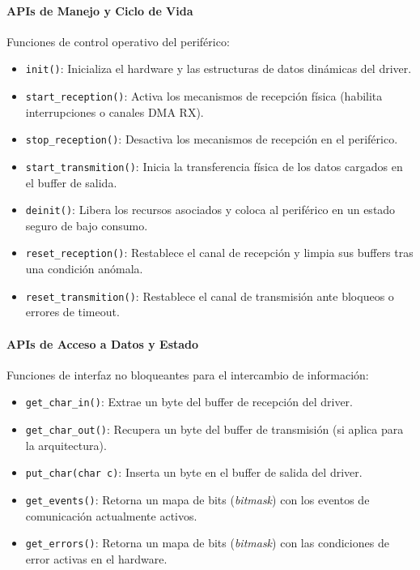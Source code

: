 \paragraph{APIs de Manejo y Ciclo de Vida} Funciones de control operativo del periférico:
\begin{itemize}
    \item \texttt{init()}: Inicializa el hardware y las estructuras de datos dinámicas del driver.
    \item \texttt{start\_reception()}: Activa los mecanismos de recepción física (habilita interrupciones o canales DMA RX).
    \item \texttt{stop\_reception()}: Desactiva los mecanismos de recepción en el periférico.
    \item \texttt{start\_transmition()}: Inicia la transferencia física de los datos cargados en el buffer de salida.
    \item \texttt{deinit()}: Libera los recursos asociados y coloca al periférico en un estado seguro de bajo consumo.
    \item \texttt{reset\_reception()}: Restablece el canal de recepción y limpia sus buffers tras una condición anómala.
    \item \texttt{reset\_transmition()}: Restablece el canal de transmisión ante bloqueos o errores de timeout.
\end{itemize}

\paragraph{APIs de Acceso a Datos y Estado} Funciones de interfaz no bloqueantes para el intercambio de información:
\begin{itemize}
    \item \texttt{get\_char\_in()}: Extrae un byte del buffer de recepción del driver.
    \item \texttt{get\_char\_out()}: Recupera un byte del buffer de transmisión (si aplica para la arquitectura).
    \item \texttt{put\_char(char~c)}: Inserta un byte en el buffer de salida del driver.
    \item \texttt{get\_events()}: Retorna un mapa de bits (\textit{bitmask}) con los eventos de comunicación actualmente activos.
    \item \texttt{get\_errors()}: Retorna un mapa de bits (\textit{bitmask}) con las condiciones de error activas en el hardware.
\end{itemize}

